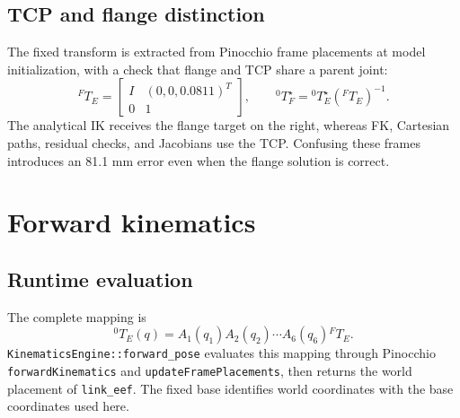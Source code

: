\documentclass[11pt,a4paper]{report}
\newcommand{\file}[1]{\nolinkurl{#1}}
\begin{document}
\subsection{TCP and flange distinction}
The fixed transform is extracted from Pinocchio frame placements at model
initialization, with a check that flange and TCP share a parent joint:
\begin{equation}
 {}^F T_E=\begin{bmatrix}I&(0,0,0.0811)^T\\0&1\end{bmatrix},\qquad
 {}^0 T_F^{\star}={}^0 T_E^{\star}({}^F T_E)^{-1}.
 \label{eq:tcp}
\end{equation}
The analytical IK receives the flange target on the right, whereas FK,
Cartesian paths, residual checks, and Jacobians use the TCP. Confusing these
frames introduces an 81.1 mm error even when the flange solution is correct.

\section{Forward kinematics}
\subsection{Runtime evaluation}
The complete mapping is
\begin{equation}
 {}^0 T_E(q)=A_1(q_1)A_2(q_2)\cdots A_6(q_6){}^F T_E.
 \label{eq:fk}
\end{equation}
\file{KinematicsEngine::forward_pose} evaluates this mapping through
Pinocchio \file{forwardKinematics} and \file{updateFramePlacements}, then
returns the world placement of \file{link_eef}. The fixed base identifies
world coordinates with the base coordinates used here.
\end{document}
